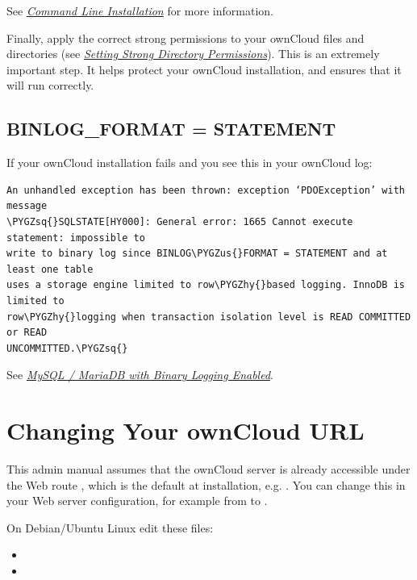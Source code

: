 \documentclass[letterpaper,10pt,english]{sphinxmanual}
\def\PYGZus{\char`\_}
\def\PYGZhy{\char`\-}
\def\PYGZsq{\char`\'}
\begin{document}
See {\hyperref[configuration_server/occ_command:command-line-installation-label]{\emph{Command Line Installation}}} for more information.

Finally, apply the correct strong permissions to your ownCloud files and
directories (see {\hyperref[installation/installation_wizard:strong-perms-label]{\emph{Setting Strong Directory Permissions}}}). This is an extremely important
step. It helps protect your ownCloud installation, and ensures that it will run
correctly.


\subsection{BINLOG\_FORMAT = STATEMENT}
\label{installation/command_line_installation:binlog-format-statement}
If your ownCloud installation fails and you see this in your ownCloud log:

\begin{Verbatim}[commandchars=\\\{\}]
An unhandled exception has been thrown: exception ‘PDOException’ with message
\PYGZsq{}SQLSTATE[HY000]: General error: 1665 Cannot execute statement: impossible to
write to binary log since BINLOG\PYGZus{}FORMAT = STATEMENT and at least one table
uses a storage engine limited to row\PYGZhy{}based logging. InnoDB is limited to
row\PYGZhy{}logging when transaction isolation level is READ COMMITTED or READ
UNCOMMITTED.\PYGZsq{}
\end{Verbatim}

See {\hyperref[configuration_database/linux_database_configuration:db-binlog-label]{\emph{MySQL / MariaDB with Binary Logging Enabled}}}.


\section{Changing Your ownCloud URL}
\label{installation/changing_the_web_route::doc}\label{installation/changing_the_web_route:changing-your-owncloud-url}
This admin manual assumes that the ownCloud server is already accessible under the Web route
, which is the default at installation, e.g. . You can change this in your Web server configuration, for example from  to .

On Debian/Ubuntu Linux edit these files:
\begin{itemize}
\item {} 

\item {} 

\end{itemize}
\end{document}
